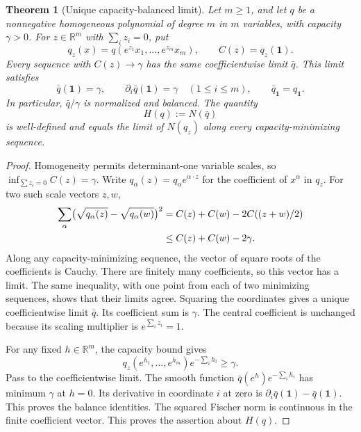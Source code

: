 \documentclass[11pt,a4paper]{article}
\newtheorem{theorem}{Theorem}[section]
\theoremstyle{definition}
\theoremstyle{remark}
\newcommand{\R}{\mathbb{R}}
\begin{document}
\begin{theorem}[Unique capacity-balanced limit]\label{thm:r2-balanced-limit}
Let $m\ge1$, and let $q$ be a nonnegative homogeneous polynomial of degree $m$ in $m$ variables, with capacity $\gamma>0$.
For $z\in\R^m$ with $\sum_i z_i=0$, put
\[
 q_z(x)=q(e^{z_1}x_1,\ldots,e^{z_m}x_m),\qquad C(z)=q_z(\mathbf1).
\]
Every sequence with $C(z)\to\gamma$ has the same coefficientwise limit $\bar q$.
This limit satisfies
\begin{equation}\label{eq:r2-balanced-limit}
 \bar q(\mathbf1)=\gamma,
 \qquad \partial_i\bar q(\mathbf1)=\gamma\quad(1\le i\le m),
 \qquad \bar q_{\mathbf1}=q_{\mathbf1}.
\end{equation}
In particular, $\bar q/\gamma$ is normalized and balanced.
The quantity
\begin{equation}\label{eq:r2-H-definition}
 H(q):=N(\bar q)
\end{equation}
is well-defined and equals the limit of $N(q_z)$ along every capacity-minimizing sequence.
\end{theorem}

\begin{proof}
Homogeneity permits determinant-one variable scales, so $\inf_{\sum z_i=0}C(z)=\gamma$.
Write $q_\alpha(z)=q_\alpha e^{\alpha\cdot z}$ for the coefficient of $x^\alpha$ in $q_z$.
For two such scale vectors $z,w$,
\begin{align}
 \sum_\alpha\bigl(\sqrt{q_\alpha(z)}-\sqrt{q_\alpha(w)}\bigr)^2
 &=C(z)+C(w)-2C((z+w)/2)\notag\\
 &\le C(z)+C(w)-2\gamma.\label{eq:r2-square-root-distance}
\end{align}
Along any capacity-minimizing sequence, the vector of square roots of the coefficients is Cauchy.
There are finitely many coefficients, so this vector has a limit.
The same inequality, with one point from each of two minimizing sequences, shows that their limits agree.
Squaring the coordinates gives a unique coefficientwise limit $\bar q$.
Its coefficient sum is $\gamma$.
The central coefficient is unchanged because its scaling multiplier is $e^{\sum_i z_i}=1$.

For any fixed $h\in\R^m$, the capacity bound gives
\[
 q_z(e^{h_1},\ldots,e^{h_m})e^{-\sum_i h_i}\ge\gamma.
\]
Pass to the coefficientwise limit.
The smooth function $\bar q(e^h)e^{-\sum_i h_i}$ has minimum $\gamma$ at $h=0$.
Its derivative in coordinate $i$ at zero is
$\partial_i\bar q(\mathbf1)-\bar q(\mathbf1)$.
This proves the balance identities.
The squared Fischer norm is continuous in the finite coefficient vector.
This proves the assertion about $H(q)$.
\end{proof}
\end{document}
